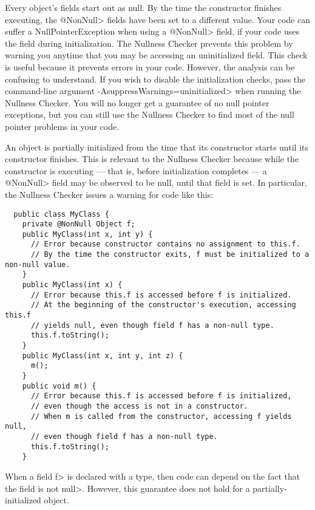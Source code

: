 Every object's fields start out as null.  By the time the constructor
finishes executing, the \<@NonNull> fields have been set to a different
value.  Your code can suffer a NullPointerException when using a
\<@NonNull> field, if your code uses the field during initialization.
The Nullness Checker prevents this problem by warning you anytime that you
may be accessing an uninitialized field.  This check is useful because it
prevents errors in your code.  However, the analysis can be confusing to
understand.  If you wish to disable the initialization checks, pass the
command-line argument \<-AsuppressWarnings=uninitialized> when running the
Nullness Checker.  You will no longer get a guarantee of no null pointer
exceptions, but you can still use the Nullness Checker to find most of the
null pointer problems in your code.


An object is partially initialized from the time that its constructor starts until its constructor
finishes.  This is relevant to the Nullness Checker because while the
constructor is executing --- that is, before initialization completes ---
a \<@NonNull>
field may be observed to be null, until that field is set.  In
particular, the Nullness Checker issues a warning for code like this:

\begin{Verbatim}
  public class MyClass {
    private @NonNull Object f;
    public MyClass(int x, int y) {
      // Error because constructor contains no assignment to this.f.
      // By the time the constructor exits, f must be initialized to a non-null value.
    }
    public MyClass(int x) {
      // Error because this.f is accessed before f is initialized.
      // At the beginning of the constructor's execution, accessing this.f
      // yields null, even though field f has a non-null type.
      this.f.toString();
    }
    public MyClass(int x, int y, int z) {
      m();
    }
    public void m() {
      // Error because this.f is accessed before f is initialized,
      // even though the access is not in a constructor.
      // When m is called from the constructor, accessing f yields null,
      // even though field f has a non-null type.
      this.f.toString();
    }
\end{Verbatim}

\noindent
When a field \<f> is declared with a 
type, then code can depend on the fact that the field is not \<null>.
However, this guarantee does not hold for a partially-initialized object.

